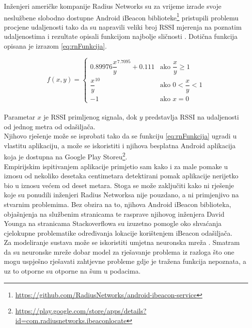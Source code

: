 Inženjeri američke kompanije Radius Networks su za vrijeme izrade svoje neslužbene slobodno dostupne Android iBeacon biblioteke\footnote{\url{https://github.com/RadiusNetworks/android-ibeacon-service}} pristupili problemu procjene udaljenosti tako da su napravili veliki broj RSSI mjerenja na poznatim udaljenostima i rezultate opisali funkcijom najbolje sličnosti \citep{stackoverflowRadiusDistancing}. 
Dotična funkcija opisana je izrazom \eqref{eq:rnFunkcija}.

\begin{equation}
	\label{eq:rnFunkcija}
	f(x,y) = 
	\begin{cases}	
	0.89976 {\dfrac{x}{y}}^{7.7095} + 0.111 & \text{ako } \dfrac{x}{y} \geq 1 \\
	{\dfrac{x}{y}}^{10} & \text{ako } 0 < \dfrac{x}{y} < 1 \\
	-1 & \text{ako } x = 0 	
	\end{cases}
\end{equation}
\\

Parametar $x$ je RSSI primljenog signala, dok $y$ predstavlja RSSI na udaljenosti od jednog metra od odašiljača. 
\\

Njihovo rješenje može se isprobati tako da se funkciju \eqref{eq:rnFunkcija} ugradi u vlastitu aplikaciju, a može se iskoristiti i njihova besplatna Android aplikacija koja je dostupna na Google Play Storeu\footnote{\url{https://play.google.com/store/apps/details?id=com.radiusnetworks.ibeaconlocate}}.
\\
Empirijskim ispitivanjem aplikacije primjetio sam kako i za male pomake u iznosu od nekoliko desetaka centimetara detektirani pomak aplikacije nerijetko bio u iznosu većem od deset metara. 
Stoga se može zaključiti kako ni rješenje koje su ponudili inženjeri Radius Networksa nije pouzdano, a ni primjenjivo na stvarnim problemima. 
Bez obzira na to, njihova Android iBeacon biblioteka, objašnjenja na službenim stranicama te rasprave njihovog inženjera David Younga na stranicama Stackoverflowa su izuzetno pomogle oko shvaćanja cjelokupne problematike određivanja lokacije korištenjem iBeacon odašiljača.
\\

Za modeliranje sustava može se iskoristiti umjetna neuronska mreža .  
Smatram da su neuronske mreže dobar model za rješavanje problema iz razloga što one mogu uspješno rješavati zahtjevne probleme gdje je tražena funkcija nepoznata, a uz to otporne su otporne na šum u podacima. 

